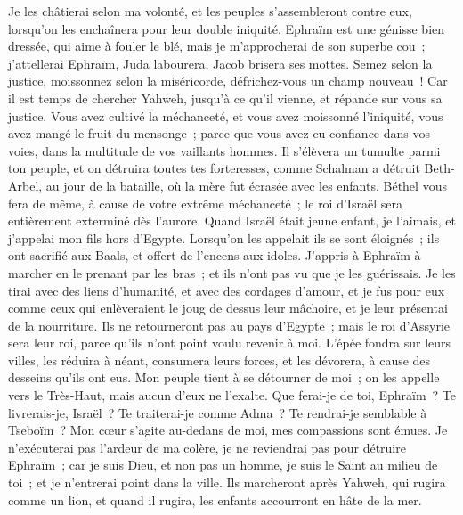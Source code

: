 \begin{multicols}{2}
Je les châtierai selon ma volonté, et les peuples s'assembleront contre eux, lorsqu'on les enchaînera pour leur double iniquité.
Ephraïm est une génisse bien dressée, qui aime à fouler le blé, mais je m'approcherai de son superbe cou~; j'attellerai Ephraïm, Juda labourera, Jacob brisera ses mottes.
Semez selon la justice, moissonnez selon la miséricorde, défrichez-vous un champ nouveau~! Car il est temps de chercher Yahweh, jusqu'à ce qu'il vienne, et répande sur vous sa justice.
Vous avez cultivé la méchanceté, et vous avez moissonné l'iniquité, vous avez mangé le fruit du mensonge~; parce que vous avez eu confiance dans vos voies, dans la multitude de vos vaillants hommes.
Il s'élèvera un tumulte parmi ton peuple, et on détruira toutes tes forteresses, comme Schalman a détruit Beth-Arbel, au jour de la bataille, où la mère fut écrasée avec les enfants.
Béthel vous fera de même, à cause de votre extrême méchanceté~; le roi d'Israël sera entièrement exterminé dès l'aurore.
\VerseOne{}Quand Israël était jeune enfant, je l'aimais, et j'appelai mon fils hors d'Egypte.
Lorsqu'on les appelait ils se sont éloignés~; ils ont sacrifié aux Baals, et offert de l'encens aux idoles.
J'appris à Ephraïm à marcher en le prenant par les bras~; et ils n'ont pas vu que je les guérissais.
Je les tirai avec des liens d'humanité, et avec des cordages d'amour, et je fus pour eux comme ceux qui enlèveraient le joug de dessus leur mâchoire, et je leur présentai de la nourriture.
Ils ne retourneront pas au pays d'Egypte~; mais le roi d'Assyrie sera leur roi, parce qu'ils n'ont point voulu revenir à moi.
L'épée fondra sur leurs villes, les réduira à néant, consumera leurs forces, et les dévorera, à cause des desseins qu'ils ont eus.
Mon peuple tient à se détourner de moi~; on les appelle vers le Très-Haut, mais aucun d'eux ne l'exalte.
Que ferai-je de toi, Ephraïm~? Te livrerais-je, Israël~? Te traiterai-je comme Adma~? Te rendrai-je semblable à Tseboïm~? Mon cœur s'agite au-dedans de moi, mes compassions sont émues.
Je n'exécuterai pas l'ardeur de ma colère, je ne reviendrai pas pour détruire Ephraïm~; car je suis Dieu, et non pas un homme, je suis le Saint au milieu de toi~; et je n'entrerai point dans la ville.
Ils marcheront après Yahweh, qui rugira comme un lion, et quand il rugira, les enfants accourront en hâte de la mer.

\end{multicols}
